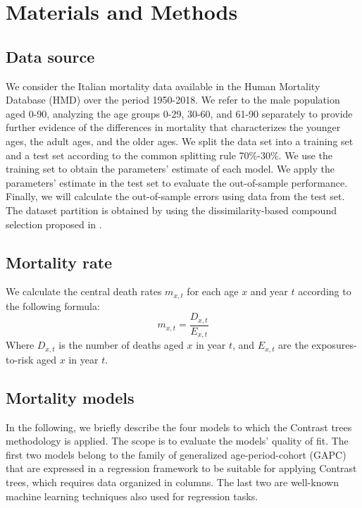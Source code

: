 \documentclass[fleqn,10pt]{wlscirep}
\begin{document}
\section*{Materials and Methods}

\subsection*{Data source}

We consider the Italian mortality data available in the Human Mortality Database (HMD) over the period 1950-2018. We refer to the male population aged \color{blue}0-90, analyzing the age groups 0-29, 30-60, and 61-90 separately to provide further evidence of the differences in mortality that characterizes the younger ages, the adult ages, and the older ages. 
We split the data set into a training set and a test set according to the common splitting rule 70\%-30\%. 
We use the training set to obtain the parameters' estimate of each model. We apply the parameters' estimate in the test set to evaluate the out-of-sample performance. Finally, we will calculate the out-of-sample errors using data from the test set.
\color{black}
The dataset partition is obtained by using the dissimilarity-based compound selection proposed in \cite{Willett1999}.

\subsection*{Mortality rate}
We calculate the central death rates $m_{x,t}$ for each age $x$ and year $t$ according to the following formula:
\begin{equation} 
\label{eq:mxt}
m_{x,t}=\frac{D_{x,t}}{E_{x,t}}
\end{equation}
Where $D_{x,t}$ is the number of deaths aged $x$ in year $t$, and $E_{x,t}$ are the exposures-to-risk aged $x$ in year $t$.

\subsection*{Mortality models}
\color{blue}In the following, we briefly describe the four models to which the Contrast trees methodology is applied. The scope is to evaluate the models' quality of fit. \color{black}
The first two models belong to the family of generalized age-period-cohort (GAPC) that are expressed in a regression framework to be suitable for applying Contrast trees, which requires data organized in columns. The last two are well-known machine learning techniques also used for regression tasks.\\
\end{document}
